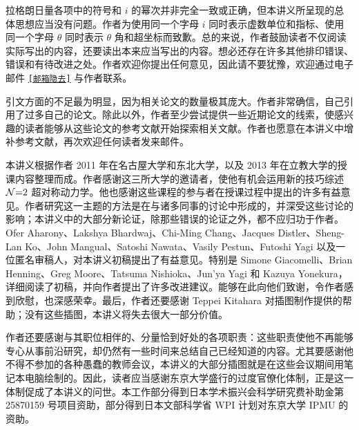拉格朗日量各项中的符号和 $i$ 的幂次并非完全一致或正确，但本讲义所呈现的总体思想应当没有问题。作者为使用同一个字母 $i$ 同时表示虚数单位和指标、使用同一个字母 $\theta$ 同时表示 $\theta$ 角和超坐标而致歉。总的来说，作者鼓励读者不仅阅读实际写出的内容，还要读出本来应当写出的内容。想必还存在许多其他排印错误、错误和有待改进之处。作者欢迎你提出任何意见，因此请不要犹豫，欢迎通过电子邮件 \href{mailto:[邮箱隐去]}{\texttt{[邮箱隐去]}} 与作者联系。

引文方面的不足最为明显，因为相关论文的数量极其庞大。作者非常确信，自己引用了过多自己的论文。除此以外，作者至少尝试提供一些近期论文的线索，使感兴趣的读者能够从这些论文的参考文献开始探索相关文献。作者也愿意在本讲义中增补参考文献，再次欢迎任何读者发来邮件。

本讲义根据作者 2011 年在名古屋大学和东北大学，以及 2013 年在立教大学的授课内容整理而成。作者感谢这三所大学的邀请者，使他有机会运用新的技巧综述 $\mathcal{N}{=}2$ 超对称动力学。他也感谢这些课程的参与者在授课过程中提出的许多有益意见。作者研究这一主题的方法是在与诸多同事的讨论中形成的，并深受这些讨论的影响；本讲义中的大部分新论证，除那些错误的论证之外，都不应归功于作者。Ofer Aharony、Lakshya Bhardwaj、Chi-Ming Chang、Jacques Distler、Sheng-Lan Ko、John Mangual、Satoshi Nawata、Vasily Pestun、Futoshi Yagi 以及一位匿名审稿人，对本讲义初稿提出了有益意见。特别是 Simone Giacomelli、Brian Henning、Greg Moore、Tatsuma Nishioka、Jun'ya Yagi 和 Kazuya Yonekura，详细阅读了初稿，并向作者提出了许多改进建议。能够在此向他们致谢，令作者感到欣慰，也深感荣幸。最后，作者还要感谢 Teppei Kitahara 对插图制作提供的帮助；没有这些插图，本讲义将失去很大一部分价值。

作者还要感谢与其职位相伴的、分量恰到好处的各项职责：这些职责使他不再能够专心从事前沿研究，却仍然有一些时间来总结自己已经知道的内容。尤其要感谢他不得不参加的各种愚蠢的教师会议，本讲义的大部分插图就是在这些会议期间用笔记本电脑绘制的。因此，读者应当感谢东京大学盛行的过度官僚化体制，正是这一体制促成了本讲义的问世。本工作部分得到日本学术振兴会科学研究费补助金第 25870159 号项目资助，部分得到日本文部科学省 WPI 计划对东京大学 IPMU 的资助。
